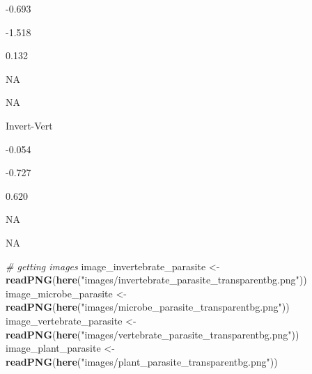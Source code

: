 \documentclass[
]{article}
\newenvironment{Shaded}{\begin{snugshade}}{\end{snugshade}}
\newcommand{\CommentTok}[1]{\textcolor[rgb]{0.56,0.35,0.01}{\textit{#1}}}
\newcommand{\KeywordTok}[1]{\textcolor[rgb]{0.13,0.29,0.53}{\textbf{#1}}}
\newcommand{\NormalTok}[1]{#1}
\newcommand{\StringTok}[1]{\textcolor[rgb]{0.31,0.60,0.02}{#1}}
\begin{document}
-0.693

-1.518

0.132

NA

NA

Invert-Vert

-0.054

-0.727

0.620

NA

NA

\begin{Shaded}
\begin{Highlighting}[]
\CommentTok{# getting images}
\NormalTok{image_invertebrate_parasite <-}\StringTok{ }\KeywordTok{readPNG}\NormalTok{(}\KeywordTok{here}\NormalTok{(}\StringTok{"images/invertebrate_parasite_transparentbg.png"}\NormalTok{))}
\NormalTok{image_microbe_parasite <-}\StringTok{ }\KeywordTok{readPNG}\NormalTok{(}\KeywordTok{here}\NormalTok{(}\StringTok{"images/microbe_parasite_transparentbg.png"}\NormalTok{))}
\NormalTok{image_vertebrate_parasite <-}\StringTok{ }\KeywordTok{readPNG}\NormalTok{(}\KeywordTok{here}\NormalTok{(}\StringTok{"images/vertebrate_parasite_transparentbg.png"}\NormalTok{))}
\NormalTok{image_plant_parasite <-}\StringTok{ }\KeywordTok{readPNG}\NormalTok{(}\KeywordTok{here}\NormalTok{(}\StringTok{"images/plant_parasite_transparentbg.png"}\NormalTok{))}


\end{Highlighting}
\end{Shaded}
\end{document}

